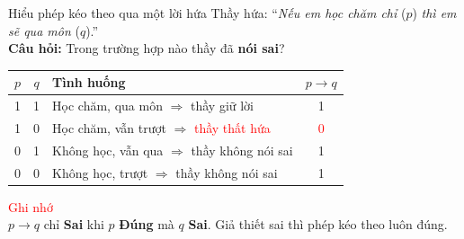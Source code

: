 \documentclass[aspectratio=169, 11pt]{beamer}
\begin{document}
\begin{frame}{Hiểu phép kéo theo qua một lời hứa}
Thầy hứa: ``\textit{Nếu em học chăm chỉ} ($p$) \textit{thì em sẽ qua môn} ($q$).''\\
\textbf{Câu hỏi:} Trong trường hợp nào thầy đã \textbf{nói sai}?

\vspace{0.25cm}
\begin{center}
\begin{tabular}{cclc}
\hline
$p$ & $q$ & \textbf{Tình huống} & $p \rightarrow q$ \\
\hline
1 & 1 & Học chăm, qua môn $\Rightarrow$ thầy giữ lời & 1 \\
1 & 0 & Học chăm, vẫn trượt $\Rightarrow$ \textcolor{red}{thầy thất hứa} & \textcolor{red}{0} \\
0 & 1 & Không học, vẫn qua $\Rightarrow$ thầy không nói sai & 1 \\
0 & 0 & Không học, trượt $\Rightarrow$ thầy không nói sai & 1 \\
\hline
\end{tabular}
\end{center}

\vspace{0.25cm}
\textcolor{red}{Ghi nhớ}\\
$p \rightarrow q$ chỉ \textbf{Sai} khi $p$ \textbf{Đúng} mà $q$ \textbf{Sai}. Giả thiết sai thì phép kéo theo luôn đúng.
\end{frame}
\end{document}
